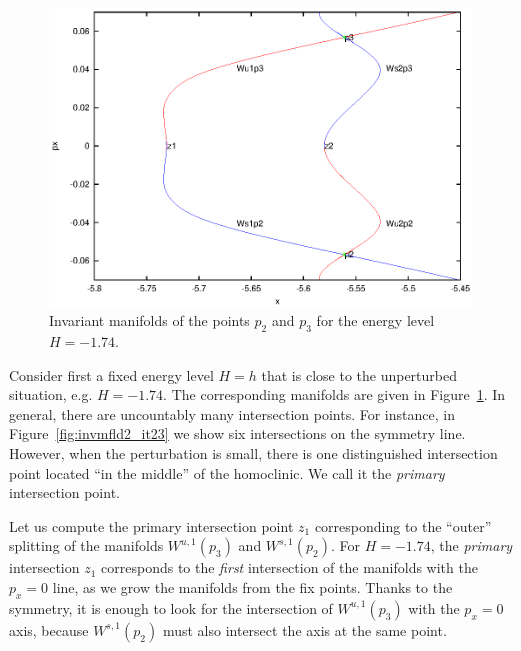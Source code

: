 \begin{figure}
\includegraphics{figs/invmfld2_it23_H174}
\caption{Invariant manifolds of the points $p_2$ and $p_3$ for the energy
level $H=-1.74$.}
\label{fig:invmfld2_it23_H174}
\end{figure}

Consider first a fixed energy level $H=h$ that is close to the
unperturbed situation, e.g. $H=-1.74$. 
The corresponding manifolds are given in
Figure~\ref{fig:invmfld2_it23_H174}.
In general, there are uncountably many intersection points.
For instance, in Figure~\ref{fig:invmfld2_it23} we show six intersections on
the symmetry line.
However, when the perturbation is small, there is one distinguished
intersection point located ``in the middle'' of the homoclinic.
We call it the \emph{primary} intersection point.

Let us compute the primary intersection point $z_1$ corresponding to
the ``outer'' splitting of the manifolds $W^{u,1}(p_3)$ and
$W^{s,1}(p_2)$.
For $H=-1.74$, the \emph{primary} intersection $z_1$ corresponds to
the \emph{first} intersection of the manifolds with the $p_x=0$ line,
as we grow the manifolds from the fix points.
Thanks to the symmetry, it is enough to look for the intersection of
$W^{u,1}(p_3)$ with the $p_x=0$ axis, because $W^{s,1}(p_2)$ must also
intersect the axis at the same point.

